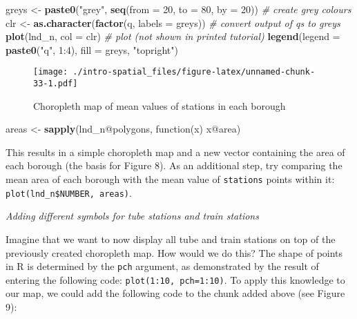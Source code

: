 \documentclass[]{article}
\newenvironment{Shaded}{}{}
\newcommand{\KeywordTok}[1]{\textcolor[rgb]{0.00,0.44,0.13}{\textbf{{#1}}}}
\newcommand{\DataTypeTok}[1]{\textcolor[rgb]{0.56,0.13,0.00}{{#1}}}
\newcommand{\DecValTok}[1]{\textcolor[rgb]{0.25,0.63,0.44}{{#1}}}
\newcommand{\StringTok}[1]{\textcolor[rgb]{0.25,0.44,0.63}{{#1}}}
\newcommand{\CommentTok}[1]{\textcolor[rgb]{0.38,0.63,0.69}{\textit{{#1}}}}
\newcommand{\NormalTok}[1]{{#1}}
\begin{document}
\begin{Shaded}
\begin{Highlighting}[]
\NormalTok{greys <-}\StringTok{ }\KeywordTok{paste0}\NormalTok{(}\StringTok{"grey"}\NormalTok{, }\KeywordTok{seq}\NormalTok{(}\DataTypeTok{from =} \DecValTok{20}\NormalTok{, }\DataTypeTok{to =} \DecValTok{80}\NormalTok{, }\DataTypeTok{by =} \DecValTok{20}\NormalTok{)) }\CommentTok{# create grey colours}
\NormalTok{clr <-}\StringTok{ }\KeywordTok{as.character}\NormalTok{(}\KeywordTok{factor}\NormalTok{(q, }\DataTypeTok{labels =} \NormalTok{greys)) }\CommentTok{# convert output of qs to greys}
\KeywordTok{plot}\NormalTok{(lnd_n, }\DataTypeTok{col =} \NormalTok{clr) }\CommentTok{# plot (not shown in printed tutorial)}
\KeywordTok{legend}\NormalTok{(}\DataTypeTok{legend =} \KeywordTok{paste0}\NormalTok{(}\StringTok{"q"}\NormalTok{, }\DecValTok{1}\NormalTok{:}\DecValTok{4}\NormalTok{), }\DataTypeTok{fill =} \NormalTok{greys, }\StringTok{"topright"}\NormalTok{)}
\end{Highlighting}
\end{Shaded}

\begin{figure}[htbp]
\centering
\texttt{[image: ./intro-spatial\_files/figure-latex/unnamed-chunk-33-1.pdf]}
\caption{Choropleth map of mean values of stations in each borough}
\end{figure}

\begin{Shaded}
\begin{Highlighting}[]
\NormalTok{areas <-}\StringTok{ }\KeywordTok{sapply}\NormalTok{(lnd_n@polygons, function(x) x@area)}
\end{Highlighting}
\end{Shaded}

This results in a simple choropleth map and a new vector containing the
area of each borough (the basis for Figure 8). As an additional step,
try comparing the mean area of each borough with the mean value of
\texttt{stations} points within it:
\texttt{plot(lnd\_n\$NUMBER, areas)}.

\emph{Adding different symbols for tube stations and train stations}

Imagine that we want to now display all tube and train stations on top
of the previously created choropleth map. How would we do this? The
shape of points in R is determined by the \texttt{pch} argument, as
demonstrated by the result of entering the following code:
\texttt{plot(1:10, pch=1:10)}. To apply this knowledge to our map, we
could add the following code to the chunk added above (see Figure 9):
\end{document}
